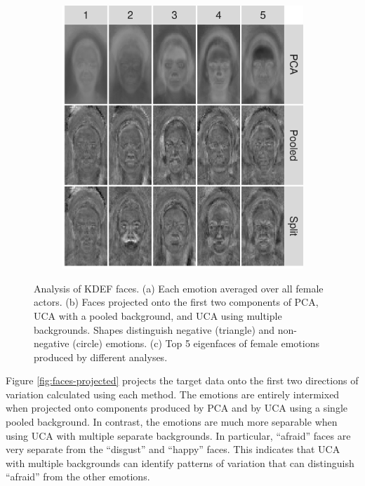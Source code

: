 \documentclass[12pt]{article}
\begin{document}
\begin{figure}
\begin{subfigure}{.49\linewidth}
    \includegraphics[width=\textwidth]{figure/all_Afraid_removed.png}
    \caption{}
   \label{fig:faces-eigenfaces}
    \end{subfigure}
    \caption{Analysis of KDEF faces. (a) Each emotion averaged over all female actors. (b) Faces projected onto the first two components of PCA, UCA with a pooled background, and UCA using multiple backgrounds. Shapes distinguish negative (triangle) and non-negative (circle) emotions. (c) Top 5 eigenfaces of female emotions produced by different analyses.}
\end{figure}

Figure \ref{fig:faces-projected} projects the target data onto the first two directions of variation calculated using each method. The emotions are entirely intermixed when projected onto components produced by PCA and by UCA using a single pooled background. In contrast, the emotions are much more separable when using UCA with multiple separate backgrounds. In particular, ``afraid'' faces are very separate from the ``disgust'' and ``happy'' faces. This indicates that UCA with multiple backgrounds can identify patterns of variation that can distinguish ``afraid'' from the other emotions.
\end{document}
